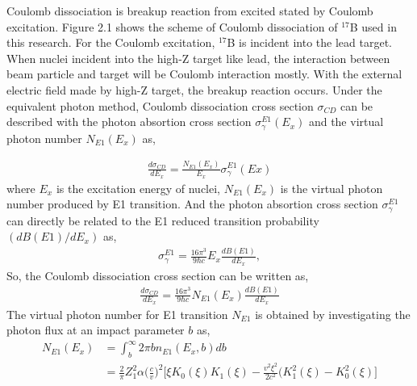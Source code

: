 Coulomb dissociation is breakup reaction from excited stated by Coulomb excitation. 
Figure 2.1 shows the scheme of Coulomb dissociation of ${}^{17}$B used in this research. For the Coulomb excitation, ${}^{17}$B is incident into the lead target. When nuclei incident into the high-Z target like lead, the interaction between beam particle and target will be Coulomb interaction mostly. With the external electric field  made by high-Z target, the breakup reaction occurs. Under the equivalent photon method\cite{Bertulani}, Coulomb dissociation cross section $\sigma_{CD}$ can be described with the photon absortion cross section $\sigma_{\gamma}^{E1}(E_x)$ and the virtual photon number $N_{E1}(E_x)$ as,

\begin{align}
    \frac{d\sigma_{CD}}{dE_x} = \frac{N_{E1}(E_x)}{E_x} \sigma_{\gamma}^{E1}(Ex) 
\end{align}
where $E_x$ is the excitation energy of nuclei, $N_{E1}(E_x)$ is the virtual photon number produced by E1 transition. And the photon absortion cross section $\sigma_{\gamma}^{E1}$ can directly be related to the E1 reduced transition probability $(dB(E1)/dE_x)$ as, 
\begin{align}
    \sigma_{\gamma}^{E1} = \frac{16 \pi^3}{9 \hbar c} E_x \frac{dB(E1)}{dE_x},
\end{align}
So, the Coulomb dissociation cross section can be written as,
\begin{align}
    \frac{d\sigma_{CD}}{dE_x} = \frac{16 \pi^3}{9 \hbar c} N_{E1}(E_x) \frac{dB(E1)}{dE_x}
\end{align}
The virtual photon number for E1 transition $N_{E1}$ is obtained by investigating the photon flux at an impact parameter $b$ as,
\begin{align}
    N_{E1}(E_x) &= \int_{b}^{\infty} 2\pi b n_{E1}(E_x, b) db  \\
                &=\frac{2}{\pi}Z^{2}_{1}\alpha\Big(\frac{c}{v}\Big)^{2}\Big[\xi K_{0}(\xi)K_{1}(\xi)-\frac{v^{2}\xi^{2}}{2c^{2}}(K^{2}_{1}(\xi)-K^{2}_{0}(\xi)\Big]
\end{align}

